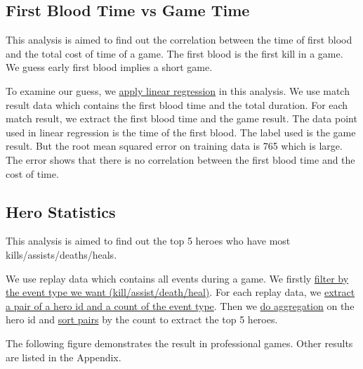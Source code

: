 \documentclass{article}
\begin{document}
\subsection{First Blood Time vs Game Time}

This analysis is aimed to find out the correlation between the time of first blood and the total cost of time of a game. The first blood is the first kill in a game. We guess early first blood implies a short game.

To examine our guess, we \href{https://github.com/Vopaaz/big-data-psg-lgd/blob/master/src/main/scala/FirstBloodTrain.scala#L31-L33}{apply linear regression} in this analysis. We use match result data which contains the first blood time and the total duration. For each match result, we extract the first blood time and the game result. The data point used in linear regression is the time of the first blood. The label used is the game result. But the root mean squared error on training data is 765 which is large. The error shows that there is no correlation between the first blood time and the cost of time.

\subsection{Hero Statistics}

This analysis is aimed to find out the top 5 heroes who have most kills/assists/deaths/heals.

We use replay data which contains all events during a game. We firstly \href{https://github.com/Vopaaz/big-data-psg-lgd/blob/master/src/main/scala/HeroMostStats.scala#L60}{filter by the event type we want (kill/assist/death/heal)}. For each replay data, we \href{https://github.com/Vopaaz/big-data-psg-lgd/blob/master/src/main/scala/HeroMostStats.scala#L61}{extract a pair of a hero id and a count of the event type}. Then we \href{https://github.com/Vopaaz/big-data-psg-lgd/blob/master/src/main/scala/HeroMostStats.scala#L62}{do aggregation} on the hero id and \href{https://github.com/Vopaaz/big-data-psg-lgd/blob/master/src/main/scala/HeroMostStats.scala#L65}{sort pairs} by the count to extract the top 5 heroes.

The following figure demonstrates the result in professional games. Other results are listed in the Appendix.
\end{document}
